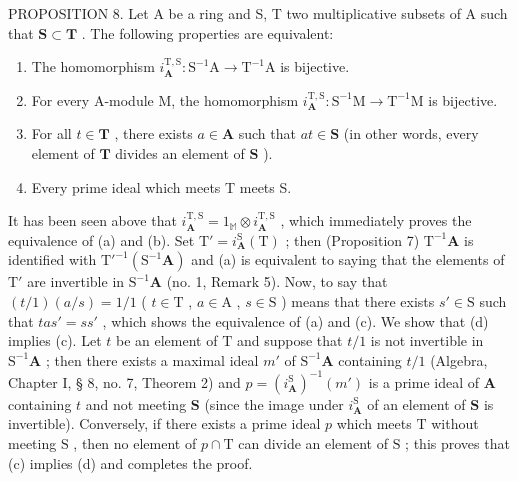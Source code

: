 PROPOSITION 8. Let A be a ring and S, T two multiplicative subsets of A such that \(\mathbf{S} \subset \mathbf{T}\) . The following properties are equivalent:

\begin{enumerate}
\def\labelenumi{(\alph{enumi})}
\item
  The homomorphism \(i_{\mathbf{A}}^{\mathrm{T},\mathrm{S}}: \mathrm{S}^{-1}\mathrm{A} \to \mathrm{T}^{-1}\mathrm{A}\) is bijective.
\item
  For every A-module M, the homomorphism \(i_{\mathbf{A}}^{\mathrm{T},\mathrm{S}}: \mathrm{S}^{-1}\mathrm{M} \to \mathrm{T}^{-1}\mathrm{M}\) is bijective.
\item
  For all \(t \in \mathbf{T}\) , there exists \(a \in \mathbf{A}\) such that \(at \in \mathbf{S}\) (in other words, every element of \(\mathbf{T}\) divides an element of \(\mathbf{S}\) ).
\item
  Every prime ideal which meets T meets S.
\end{enumerate}

It has been seen above that \(i_{\mathbf{A}}^{\mathrm{T},\mathrm{S}} = 1_{\mathbb{M}} \otimes i_{\mathbf{A}}^{\mathrm{T},\mathrm{S}}\) , which immediately proves the equivalence of (a) and (b). Set \(\mathrm{T}' = i_{\mathbf{A}}^{\mathrm{S}}(\mathrm{T})\) ; then (Proposition 7) \(\mathrm{T}^{-1}\mathbf{A}\) is identified with \(\mathrm{T}'^{-1}(\mathrm{S}^{-1}\mathbf{A})\) and (a) is equivalent to saying that the elements of \(\mathrm{T}'\) are invertible in \(\mathrm{S}^{-1}\mathbf{A}\) (no. 1, Remark 5). Now, to say that \((t/1)(a/s) = 1/1\) ( \(t \in \mathrm{T}\) , \(a \in \mathrm{A}\) , \(s \in \mathrm{S}\) ) means that there exists \(s' \in \mathrm{S}\) such that \(tas' = ss'\) , which shows the equivalence of (a) and (c). We show that (d) implies (c). Let \(t\) be an element of \(\mathrm{T}\) and suppose that \(t/1\) is not invertible in \(\mathrm{S}^{-1}\mathbf{A}\) ; then there exists a maximal ideal \(m'\) of \(\mathrm{S}^{-1}\mathbf{A}\) containing \(t/1\) (Algebra, Chapter I, § 8, no. 7, Theorem 2) and \(p = (i_{\mathbf{A}}^{\mathrm{S}})^{-1}(m')\) is a prime ideal of \(\mathbf{A}\) containing \(t\) and not meeting \(\mathbf{S}\) (since the image under \(i_{\mathbf{A}}^{\mathrm{S}}\) of an element of \(\mathbf{S}\) is invertible). Conversely, if there exists a prime ideal \(p\) which meets \(\mathrm{T}\) without meeting \(\mathrm{S}\) , then no element of \(p \cap \mathrm{T}\) can divide an element of \(\mathrm{S}\) ; this proves that (c) implies (d) and completes the proof.

